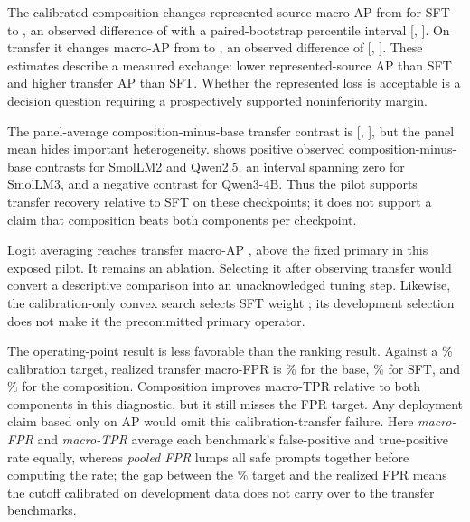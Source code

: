 \documentclass[11pt]{article}
\begin{document}


The calibrated composition changes represented-source macro-AP from
\PilotSFTRepresented{} for SFT to \PilotCompositionRepresented{}, an observed difference of
\PilotRepDeltaSFT{} with a paired-bootstrap percentile interval
[\PilotRepDeltaSFTLow, \PilotRepDeltaSFTHigh].  On transfer it changes macro-AP from
\PilotSFTTransfer{} to \PilotCompositionTransfer{}, an observed difference of
\PilotTransferDeltaSFT{} [\PilotTransferDeltaSFTLow, \PilotTransferDeltaSFTHigh].  These estimates
describe a measured exchange: lower represented-source AP than SFT and higher transfer AP than
SFT.  Whether the represented loss is acceptable is a decision question requiring a prospectively
supported noninferiority margin.

The panel-average composition-minus-base transfer contrast is \PilotTransferDeltaBase{}
[\PilotTransferDeltaBaseLow, \PilotTransferDeltaBaseHigh], but the panel mean hides important
heterogeneity.   shows \PilotNTransferPositiveVsBase{} positive observed composition-minus-base contrasts
for SmolLM2 and Qwen2.5, an interval spanning zero for SmolLM3, and a negative contrast for
Qwen3-4B.  Thus the pilot supports transfer recovery relative to SFT on these checkpoints; it does
not support a claim that composition beats both components per checkpoint.



Logit averaging reaches transfer macro-AP \PilotLogitTransfer{}, above the fixed primary in this
exposed pilot.  It remains an ablation.  Selecting it after observing transfer would convert a
descriptive comparison into an unacknowledged tuning step.  Likewise, the calibration-only convex
search selects SFT weight \PilotConvexWeight{}; its development selection does not make it the
precommitted primary operator.



The operating-point result is less favorable than the ranking result.  Against a
\PilotTargetFPRPct\% calibration target, realized transfer macro-FPR is
\PilotBaseTransferFPRPct\% for the base, \PilotSFTTransferFPRPct\% for SFT, and
\PilotCompositionTransferFPRPct\% for the composition.  Composition improves macro-TPR relative
to both components in this diagnostic, but it still misses the FPR target.  Any deployment claim
based only on AP would omit this calibration-transfer failure. Here \emph{macro-FPR} and \emph{macro-TPR} average each benchmark's false-positive and true-positive rate equally, whereas \emph{pooled FPR} lumps all safe prompts together before computing the rate; the gap between the \PilotTargetFPRPct\% target and the realized FPR means the cutoff calibrated on development data does not carry over to the transfer benchmarks.
\end{document}
